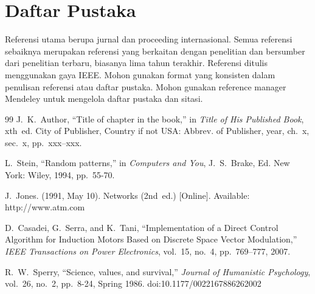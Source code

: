 \documentclass[10pt]{article}
\begin{document}
\section{Daftar Pustaka}
Referensi utama berupa jurnal dan proceeding internasional. Semua referensi sebaiknya merupakan referensi yang berkaitan dengan penelitian dan bersumber dari penelitian terbaru, biasanya lima tahun terakhir. Referensi ditulis menggunakan gaya IEEE. Mohon gunakan format yang konsisten dalam penulisan referensi atau daftar pustaka. Mohon gunakan reference manager Mendeley untuk mengelola daftar pustaka dan sitasi.

\begin{thebibliography}{99}
J.~K.~Author, ``Title of chapter in the book,'' in \textit{Title of His Published Book}, xth~ed. City of Publisher, Country if not USA: Abbrev. of Publisher, year, ch.~x, sec.~x, pp.~xxx--xxx.

L.~Stein, ``Random patterns,'' in \textit{Computers and You}, J.~S.~Brake, Ed. New York: Wiley, 1994, pp.~55-70.

J.~Jones. (1991, May 10). Networks (2nd~ed.) [Online]. Available: http://www.atm.com

D.~Casadei, G.~Serra, and K.~Tani, ``Implementation of a Direct Control Algorithm for Induction Motors Based on Discrete Space Vector Modulation,'' \textit{IEEE Transactions on Power Electronics}, vol.~15, no.~4, pp.~769--777, 2007.

R.~W.~Sperry, ``Science, values, and survival,'' \textit{Journal of Humanistic Psychology}, vol.~26, no.~2, pp.~8-24, Spring 1986. doi:10.1177/0022167886262002
\end{thebibliography}
\end{document}
